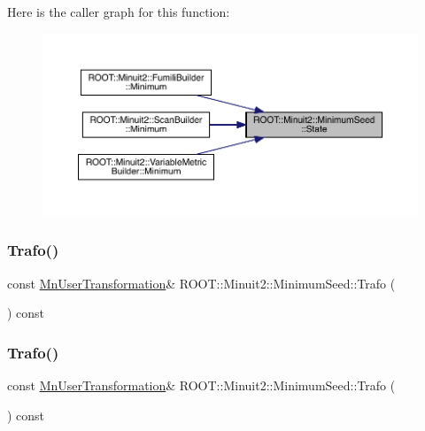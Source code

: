 Here is the caller graph for this function\+:\nopagebreak
\begin{figure}[H]
\begin{center}
\leavevmode
\includegraphics[width=350pt]{d1/d50/classROOT_1_1Minuit2_1_1MinimumSeed_a732476aa579a27366511684213835a2e_icgraph}
\end{center}
\end{figure}
\mbox{\label{classROOT_1_1Minuit2_1_1MinimumSeed_a140162d25593e6675f6f521fc9d5fc84}} 
\subsubsection{\texorpdfstring{Trafo()}{Trafo()}\hspace{0.1cm}{\footnotesize\ttfamily [1/2]}}
{\footnotesize\ttfamily const \mbox{\hyperlink{classROOT_1_1Minuit2_1_1MnUserTransformation}{Mn\+User\+Transformation}}\& R\+O\+O\+T\+::\+Minuit2\+::\+Minimum\+Seed\+::\+Trafo (\begin{DoxyParamCaption}{ }\end{DoxyParamCaption}) const\hspace{0.3cm}{\ttfamily [inline]}}

\mbox{\label{classROOT_1_1Minuit2_1_1MinimumSeed_a140162d25593e6675f6f521fc9d5fc84}} 
\subsubsection{\texorpdfstring{Trafo()}{Trafo()}\hspace{0.1cm}{\footnotesize\ttfamily [2/2]}}
{\footnotesize\ttfamily const \mbox{\hyperlink{classROOT_1_1Minuit2_1_1MnUserTransformation}{Mn\+User\+Transformation}}\& R\+O\+O\+T\+::\+Minuit2\+::\+Minimum\+Seed\+::\+Trafo (\begin{DoxyParamCaption}{ }\end{DoxyParamCaption}) const\hspace{0.3cm}{\ttfamily [inline]}}

